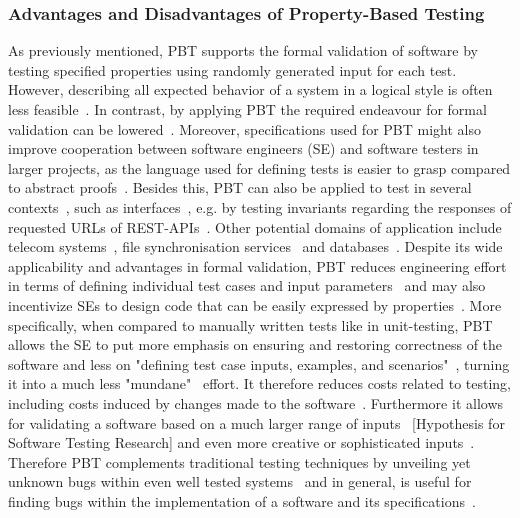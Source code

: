\documentclass[runningheads]{llncs}
\begin{document}
\subsubsection{Advantages and Disadvantages of Property-Based Testing}
As previously mentioned, PBT supports the formal validation of software by testing specified properties using randomly generated input for each test. However, describing all expected behavior of a system in a logical style is often less feasible~\cite{Chen2022,Koopman2012}. In contrast, by applying PBT the required endeavour for formal validation can be lowered~\cite{Hritcu2016,Chen2022,Paraskevopoulou2015}. Moreover, specifications used for PBT might also improve cooperation between software engineers (SE) and software testers in larger projects, as the language used for defining tests is easier to grasp compared to abstract proofs~\cite{Chen2022,Loescher2017}. Besides this, PBT can also be applied to test in several contexts~\cite{Karlsson2019}, such as interfaces~\cite{Karlsson2019,Francisco2013,LamelaSeijas2013}, e.g. by testing invariants regarding the responses of requested URLs of REST-APIs~\cite{Karlsson2019}. Other potential domains of application include telecom systems~\cite{Arts2006}, file synchronisation services~\cite{Hughes2016} and databases~\cite{Arts2015}. Despite its wide applicability and advantages in formal validation, PBT reduces engineering effort in terms of defining individual test cases and input parameters~\cite{Chen2022,Loescher2017,Corgozinho2023} and may also incentivize SEs to design code that can be easily expressed by properties~\cite{Chen2022}. More specifically, when compared to manually written tests like in unit-testing, PBT allows the SE to put more emphasis on ensuring and restoring correctness of the software and less on "defining test case inputs, examples, and scenarios"~\cite{Corgozinho2023}, turning it into a much less "mundane"~\cite{Loescher2017} effort. It therefore reduces costs related to testing, including costs induced by changes made to the software~\cite{Chen2022,Loescher2017}. Furthermore it allows for validating a software based on a much larger range of inputs~\cite{Loescher2017} [Hypothesis for Software Testing Research] and even more creative or sophisticated inputs~\cite{Arts2015}. Therefore PBT complements traditional testing techniques by unveiling yet unknown bugs within even well tested systems~\cite{Arts2015,Hughes2016,Arts2006} and in general, is useful for finding bugs within the implementation of a software and its specifications~\cite{Chen2022,Fink1997,Loescher2017,Paraskevopoulou2015,Claessen2000,Corgozinho2023}.
\end{document}
